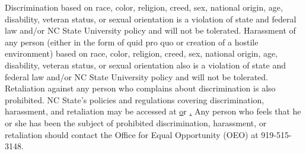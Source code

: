 \footnotesize{Discrimination based on race, color, religion, creed, sex, national origin, age, disability, veteran status, or sexual orientation is a violation of state and federal law and/or NC State University policy and will not be tolerated. Harassment of any person (either in the form of quid pro quo or creation of a hostile environment) based on race, color, religion, creed, sex, national origin, age, disability, veteran status, or sexual orientation also is a violation of state and federal law and/or NC State University policy and will not be tolerated. Retaliation against any person who complains about discrimination is also prohibited. NC State's policies and regulations covering discrimination, harassment, and retaliation may be accessed at \href{http://policies.ncsu.edu/policy/pol-04-25-05} or  \href{http://www.ncsu.edu/equal_op/}. Any person who feels that he or she has been the subject of prohibited discrimination, harassment, or retaliation should contact the Office for Equal Opportunity (OEO) at 919-515-3148.}